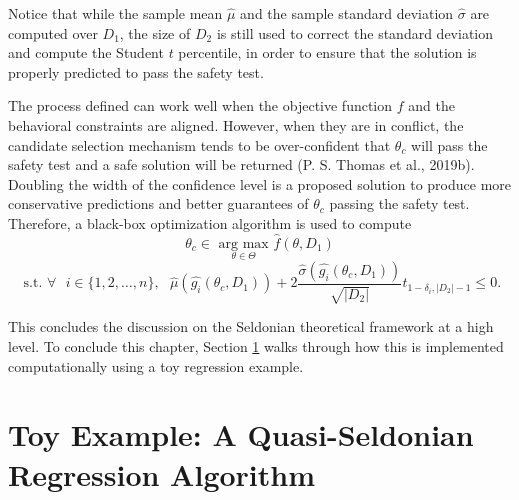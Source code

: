 \documentclass[12pt, twoside]{amherstthesis}
\begin{document}
Notice that while the sample mean \(\hat{\mu}\) and the sample standard deviation \(\hat{\sigma}\) are computed over \(D_1\), the size of \(D_2\) is still used to correct the standard deviation and compute the Student \(t\) percentile, in order to ensure that the solution is properly predicted to pass the safety test.

The process defined can work well when the objective function \(f\) and the behavioral constraints are aligned. However, when they are in conflict, the candidate selection mechanism tends to be over-confident that \(\theta_c\) will pass the safety test and a safe solution will be returned (P. S. Thomas et al., 2019b). Doubling the width of the confidence level is a proposed solution to produce more conservative predictions and better guarantees of \(\theta_c\) passing the safety test. Therefore, a black-box optimization algorithm is used to compute
\begin{equation}
\label{ch2eq14}
\theta_c \in \underset{\theta \in \Theta}{\text{ arg max }} \hat{f}(\theta, D_1)
\end{equation}
\[\text{ s.t. } \forall \text{ } i \in \{1,2,\ldots,n\}, \text{  } \hat{\mu}(\hat{g_i}(\theta_c, D_1)) + 2\frac{\hat{\sigma}(\hat{g_i}(\theta_c, D_1))}{\sqrt{|D_2|}}t_{1-\delta_i, |D_2|-1} \leq 0.\]

\hfill\break

This concludes the discussion on the Seldonian theoretical framework at a high level. To conclude this chapter, Section \ref{toy} walks through how this is implemented computationally using a toy regression example.

\hypertarget{toy}{%
\section{Toy Example: A Quasi-Seldonian Regression Algorithm}\label{toy}}
\end{document}
